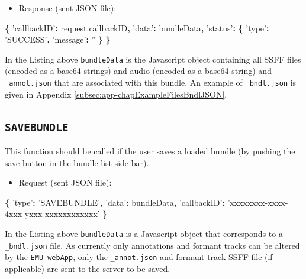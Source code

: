 \documentclass[]{book}
\newenvironment{Shaded}{\begin{snugshade}}{\end{snugshade}}
\newcommand{\AttributeTok}[1]{\textcolor[rgb]{0.77,0.63,0.00}{#1}}
\newcommand{\NormalTok}[1]{#1}
\newcommand{\OperatorTok}[1]{\textcolor[rgb]{0.81,0.36,0.00}{\textbf{#1}}}
\newcommand{\StringTok}[1]{\textcolor[rgb]{0.31,0.60,0.02}{#1}}
\newcommand{\VariableTok}[1]{\textcolor[rgb]{0.00,0.00,0.00}{#1}}
\providecommand{\tightlist}{%
  \setlength{\itemsep}{0pt}\setlength{\parskip}{0pt}}
\begin{document}
\begin{itemize}
\tightlist
\item
  Response (sent JSON file):
\end{itemize}

\begin{Shaded}
\begin{Highlighting}[]
\OperatorTok{\{}
  \StringTok{'callbackID'}\OperatorTok{:} \VariableTok{request}\NormalTok{.}\AttributeTok{callbackID}\OperatorTok{,}
  \StringTok{'data'}\OperatorTok{:}\NormalTok{ bundleData}\OperatorTok{,}
  \StringTok{'status'}\OperatorTok{:} \OperatorTok{\{}
    \StringTok{'type'}\OperatorTok{:} \StringTok{'SUCCESS'}\OperatorTok{,}
    \StringTok{'message'}\OperatorTok{:} \StringTok{''}
  \OperatorTok{\}}
\OperatorTok{\}}
\end{Highlighting}
\end{Shaded}

In the Listing above \texttt{bundleData} is the Javascript object containing all SSFF files (encoded as a base64 strings) and audio (encoded as a base64 string) and \texttt{\_annot.json} that are associated with this bundle. An example of \texttt{\_bndl.json} is given in Appendix \ref{subsec:app-chapExampleFilesBndlJSON}.

\hypertarget{savebundle}{%
\subsection{\texorpdfstring{\texttt{SAVEBUNDLE}}{SAVEBUNDLE}}\label{savebundle}}

This function should be called if the user saves a loaded bundle (by pushing the save button in the bundle list side bar).

\begin{itemize}
\tightlist
\item
  Request (sent JSON file):
\end{itemize}

\begin{Shaded}
\begin{Highlighting}[]
\OperatorTok{\{}
  \StringTok{'type'}\OperatorTok{:} \StringTok{'SAVEBUNDLE'}\OperatorTok{,}
  \StringTok{'data'}\OperatorTok{:}\NormalTok{ bundleData}\OperatorTok{,}
  \StringTok{'callbackID'}\OperatorTok{:} \StringTok{'xxxxxxxx-xxxx-4xxx-yxxx-xxxxxxxxxxxx'}
\OperatorTok{\}}
\end{Highlighting}
\end{Shaded}

In the Listing above \texttt{bundleData} is a Javascript object that corresponds to a \texttt{\_bndl.json} file. As currently only annotations and formant tracks can be altered by the \texttt{EMU-webApp}, only the \texttt{\_annot.json} and formant track SSFF file (if applicable) are sent to the server to be saved.
\end{document}
